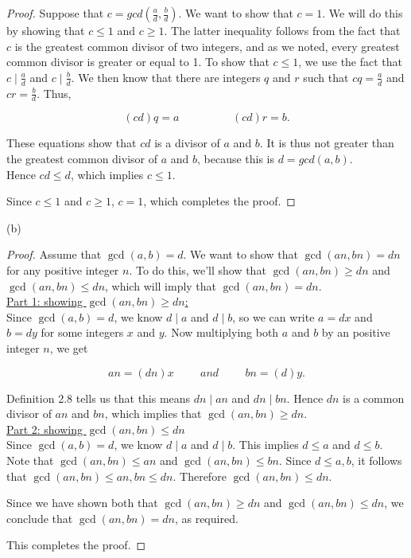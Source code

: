 \documentclass{article}
\begin{document}
\begin{proof}
    Suppose that $c=gcd(\frac{a}{d},\frac{b}{d})$. We want to show that $c=1$. We will do this by showing that $c \leq 1$ and $c \geq 1$. The latter inequality follows from the fact that $c$ is the greatest common divisor of two integers, and as we noted, every greatest common divisor is greater or equal to 1. To show that $c \leq 1$, we use the fact that $c\mid \frac{a}{d}$ and $c\mid \frac{b}{d}$. We then know that there are integers $q$ and $r$ such that $cq=\frac{a}{d}$ and $cr=\frac{b}{d}$. Thus,

    \[(cd)q=a \hspace{2cm} (cd)r=b.\]

    These equations show that $cd$ is a divisor of $a$ and $b$. It is thus not greater than the greatest common divisor of $a$ and $b$, because this is $d=gcd(a,b)$.\\
    Hence $cd \leq d$, which implies $c \leq 1$.

    Since $c \leq 1$ and $c \geq 1$, $c=1$, which completes the proof.
\end{proof}

\noindent (b)

\begin{proof}
    Assume that $\gcd\left(a, b\right)=d$. We want to show that $\gcd\left(an, bn\right)=dn$ for any positive integer $n$. To do this, we'll show that $\gcd\left(an, bn\right)\geq dn$ and $\gcd\left(an, bn\right)\leq dn$, which will imply that $\gcd\left(an, bn\right)=dn$.\\

    \underline{Part 1: showing $\gcd\left(an, bn\right)\geq dn$:}\\
    Since $\gcd\left(a, b\right)=d$, we know $d\mid a$ and $d\mid b$, so we can write $a=dx$ and $b=dy$ for some integers $x$ and $y$. Now multiplying both $a$ and $b$ by an positive integer $n$, we get

    \[an=(dn)x \hspace{1cm} and \hspace{1cm} bn=(d)y.\]

    Definition 2.8 tells us that this means $dn\mid an$ and $dn\mid bn$. Hence $dn$ is a common divisor of $an$ and $bn$, which implies that $\gcd\left(an, bn\right)\geq dn$.\\

    \underline{Part 2: showing $\gcd\left(an, bn\right)\leq dn$}\\
    Since $\gcd\left(a, b\right)=d$, we know $d\mid a$ and $d\mid b$. This implies $d \leq a$ and $d \leq b$. Note that $\gcd\left(an, bn\right)\leq an$ and $\gcd\left(an, bn\right)\leq bn$. Since $d \leq a,b$, it follows that $\gcd\left(an, bn\right)\leq an,bn \leq dn$. Therefore $\gcd\left(an, bn\right)\leq dn$.

     Since we have shown both that \(\gcd(an, bn) \geq dn\) and \(\gcd(an, bn) \leq dn\), we conclude that \(\gcd(an, bn) = dn\), as required.

    This completes the proof.
\end{proof}
\end{document}
